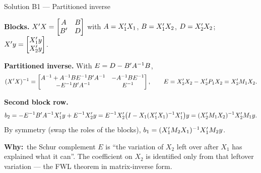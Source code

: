 \documentclass[11pt]{article}
\newcommand{\step}[1]{\par\smallskip\noindent\textbf{\textcolor{qnavy}{#1}}\quad\ignorespaces}
\newcommand{\Why}{\textbf{\textcolor{whyline}{Why:}}\ }
\begin{document}
\begin{solbox}{Solution B1 --- Partitioned inverse}
\step{Blocks.} $X^{\prime} X = \begin{bmatrix} A & B \\ B^{\prime} & D\end{bmatrix}$ with
$A = X_{1}^{\prime} X_{1}$, $B = X_{1}^{\prime} X_{2}$, $D = X_{2}^{\prime} X_{2}$; $X^{\prime} y = \begin{bmatrix} X_{1}^{\prime} y \\ X_{2}^{\prime} y\end{bmatrix}$.

\step{Partitioned inverse.} With $E = D - B^{\prime} A^{-1}B$,
\[
  (X^{\prime} X)^{-1} = \begin{bmatrix} A^{-1} + A^{-1}BE^{-1}B^{\prime} A^{-1} & -A^{-1}BE^{-1} \\
  -E^{-1}B^{\prime} A^{-1} & E^{-1}\end{bmatrix},
  \qquad E = X_{2}^{\prime} X_{2} - X_{2}^{\prime} P_{1}X_{2} = X_{2}^{\prime} M_{1}X_{2}.
\]
\step{Second block row.}
\[
  b_{2} = -E^{-1}B^{\prime} A^{-1}X_{1}^{\prime} y + E^{-1}X_{2}^{\prime} y
  = E^{-1}X_{2}^{\prime}\big(I - X_{1}(X_{1}^{\prime} X_{1})^{-1}X_{1}^{\prime}\big)y
  = (X_{2}^{\prime} M_{1}X_{2})^{-1}X_{2}^{\prime} M_{1}y .
\]
By symmetry (swap the roles of the blocks), $b_{1} = (X_{1}^{\prime} M_{2}X_{1})^{-1}X_{1}^{\prime} M_{2}y$.
\begin{why}\Why the Schur complement $E$ is ``the variation of $X_{2}$ left over after
$X_{1}$ has explained what it can''. The coefficient on $X_{2}$ is identified only from
that leftover variation --- the FWL theorem in matrix-inverse form.\end{why}
\end{solbox}
\end{document}
